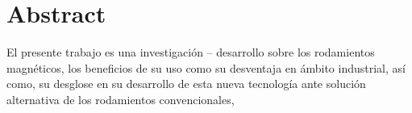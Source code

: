 %
\chapter*{Abstract}
\label{sec:abstract}
\vspace*{-10mm}

El presente trabajo es una investigación – desarrollo sobre los rodamientos magnéticos, los beneficios de su uso como su desventaja en ámbito industrial, así como, su desglose en su desarrollo de esta nueva tecnología ante solución alternativa de los rodamientos convencionales,


\vspace*{20mm}



